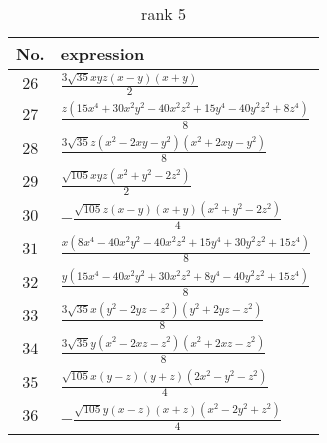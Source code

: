\documentclass[fleqn,8pt,landscape]{jsarticle}
\begin{document}
\begin{table}[ht!]
\begin{center}
\caption{rank 5}
\renewcommand{\arraystretch}{1.3}
\begin{tabular}{cl} \hline \hline
No. & expression \\ \hline
$ 26 $ & $ \frac{3 \sqrt{35} x y z \left(x - y\right) \left(x + y\right)}{2} $ \\
$ 27 $ & $ \frac{z \left(15 x^{4} + 30 x^{2} y^{2} - 40 x^{2} z^{2} + 15 y^{4} - 40 y^{2} z^{2} + 8 z^{4}\right)}{8} $ \\
$ 28 $ & $ \frac{3 \sqrt{35} z \left(x^{2} - 2 x y - y^{2}\right) \left(x^{2} + 2 x y - y^{2}\right)}{8} $ \\
$ 29 $ & $ \frac{\sqrt{105} x y z \left(x^{2} + y^{2} - 2 z^{2}\right)}{2} $ \\
$ 30 $ & $ - \frac{\sqrt{105} z \left(x - y\right) \left(x + y\right) \left(x^{2} + y^{2} - 2 z^{2}\right)}{4} $ \\
$ 31 $ & $ \frac{x \left(8 x^{4} - 40 x^{2} y^{2} - 40 x^{2} z^{2} + 15 y^{4} + 30 y^{2} z^{2} + 15 z^{4}\right)}{8} $ \\
$ 32 $ & $ \frac{y \left(15 x^{4} - 40 x^{2} y^{2} + 30 x^{2} z^{2} + 8 y^{4} - 40 y^{2} z^{2} + 15 z^{4}\right)}{8} $ \\
$ 33 $ & $ \frac{3 \sqrt{35} x \left(y^{2} - 2 y z - z^{2}\right) \left(y^{2} + 2 y z - z^{2}\right)}{8} $ \\
$ 34 $ & $ \frac{3 \sqrt{35} y \left(x^{2} - 2 x z - z^{2}\right) \left(x^{2} + 2 x z - z^{2}\right)}{8} $ \\
$ 35 $ & $ \frac{\sqrt{105} x \left(y - z\right) \left(y + z\right) \left(2 x^{2} - y^{2} - z^{2}\right)}{4} $ \\
$ 36 $ & $ - \frac{\sqrt{105} y \left(x - z\right) \left(x + z\right) \left(x^{2} - 2 y^{2} + z^{2}\right)}{4} $ \\
 \hline \hline
\end{tabular}
\end{center}
\end{table}
\end{document}
